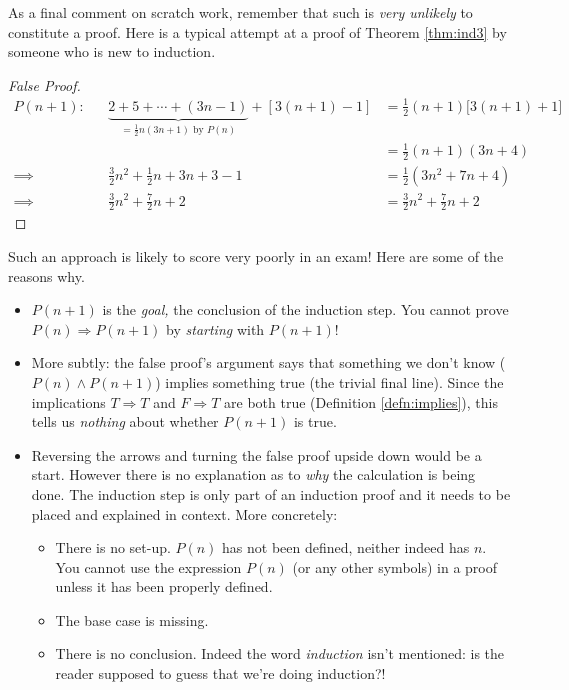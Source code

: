 As a final comment on scratch work, remember that such is \emph{very unlikely} to constitute a proof. Here is a typical attempt at a proof of Theorem \ref{thm:ind3} by someone who is new to induction.
\begin{proof}[False Proof]
	\begin{align*}
		P(n+1):&&\underbrace{2+5+\cdots+(3n-1)}_{=\frac 12n(3n+1)\text{ by }P(n)}+[3(n+1)-1]&=\frac 12(n+1)\bigl[3(n+1)+1\bigr]\phantom{osihasdhflzsjhfdk}\\[-15pt]
		&&&=\frac 12(n+1)(3n+4)\\
		\implies&&\frac 32n^2+\frac 12n+3n+3-1&=\frac 12(3n^2+7n+4)\\
		\implies&&\frac 32n^2+\frac 72n+2&=\frac 32n^2+\frac 72n+2\tag*{\qedhere}
	\end{align*}
\end{proof}

Such an approach is likely to score very poorly in an exam! Here are some of the reasons why.
\begin{itemize}
  \item $P(n+1)$ is the \emph{goal,} the conclusion of the induction step. You cannot prove $P(n)\Longrightarrow P(n+1)$ by \emph{starting} with $P(n+1)$!
  \item More subtly: the false proof's argument says that something we don't know ($P(n)\wedge P(n+1)$) implies something true (the trivial final line). Since the implications $T\Longrightarrow T$ and $F\Longrightarrow T$ are both true (Definition \ref{defn:implies}), this tells us \emph{nothing} about whether $P(n+1)$ is true.
  \item Reversing the arrows and turning the false proof upside down would be a start. However there is no explanation as to \emph{why} the calculation is being done. The induction step is only part of an induction proof and it needs to be placed and explained in context. More concretely:
  \begin{itemize}
    \item There is no set-up. $P(n)$ has not been defined, neither indeed has $n$. You cannot use the expression $P(n)$ (or any other symbols) in a proof unless it has been properly defined.
  	\item The base case is missing.
  	\item There is no conclusion. Indeed the word \emph{induction} isn't mentioned: is the reader supposed to guess that we're doing induction?!
	\end{itemize}
\end{itemize}

